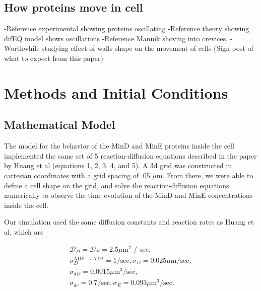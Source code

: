 \documentclass[letterpaper,twocolumn,amsmath,amssymb,pre]{revtex4-1}
\begin{document}
\subsection{How proteins move in cell}
-Reference experimental showing proteins oscillating
-Reference theory showing difEQ model shows oscillations
-Reference Mannik shoving into crevices.
-Worthwhile studying effect of walls shape on the movement of cells
(Sign post of what to expect from this paper)

\section{Methods and Initial Conditions}
\subsection{Mathematical Model} %
The model for the behavior of the MinD and MinE proteins inside the cell
implemented the same set of 5 reaction-diffusion equations described in the paper
by Huang et al (equations 1, 2, 3, 4, and 5). A 3d grid was constructed in
cartesian coordinates with a grid spacing of .05 $\mu$m. From there, we
were able to define a cell shape on the grid, and solve the
reaction-diffusion equations numerically to observe the time evolution of
the MinD and MinE concentrations inside the cell.

Our simulation used the same diffusion constants and reaction rates as
Huang et al, which are

\begin{gather*} %
  \mathcal{D}_D = \mathcal{D}_{E}  = 2.5 \mu \textrm{m$^2$ / sec}, \\
  \sigma_D^{\textrm{ADP $\rightarrow$ ATP}}  = 1/\textrm{sec},  \sigma_D = 0.025 \mu \textrm{m/sec}, \\
  \sigma_{dD}  = 0.0015 \mu \textrm{m$^3$/sec}, \\
  \sigma_{de}  = 0.7/\textrm{sec}, \sigma_E = 0.093 \mu \textrm{m$^3$/sec}.
\end{gather*}
\end{document}
